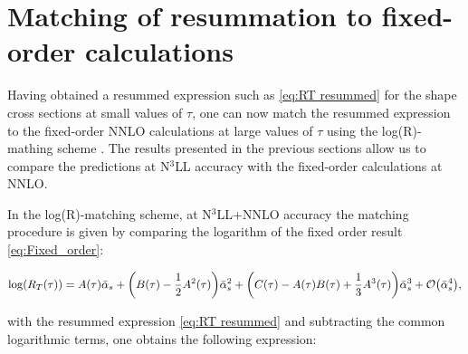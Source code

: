 \documentclass[../main.tex]{subfiles}
\begin{document}
\section{Matching of resummation to fixed-order calculations}\label{sec:Matching}

Having obtained a resummed expression such as \cref{eq:RT resummed} for the shape cross sections at small values
of $\tau$, one can now match the resummed expression to the fixed-order NNLO calculations at large values of $\tau$
using the log(R)-mathing scheme \cite{CATANI19933}. The results presented in the previous sections allow us to 
compare the predictions at N$^3$LL accuracy with the fixed-order calculations at NNLO.

In the log(R)-matching scheme, at N$^3$LL+NNLO accuracy the matching procedure is given by comparing 
the logarithm of the fixed order result \cref{eq:Fixed_order}:

\begin{equation}
    \log(R_T(\tau))= A(\tau) \bar{\alpha}_s + \qty( B(\tau) - \frac{1}{2}A^2(\tau)) \bar{\alpha}_s^2 + \qty(C(\tau) - A(\tau) B(\tau) + \frac{1}{3}A^3(\tau)) \bar{\alpha}_s^3 + \order{\bar{\alpha}_s^4}, 
\end{equation}

with the resummed expression \cref{eq:RT resummed} and subtracting the common logarithmic terms, one obtains the following expression:

\end{document}
